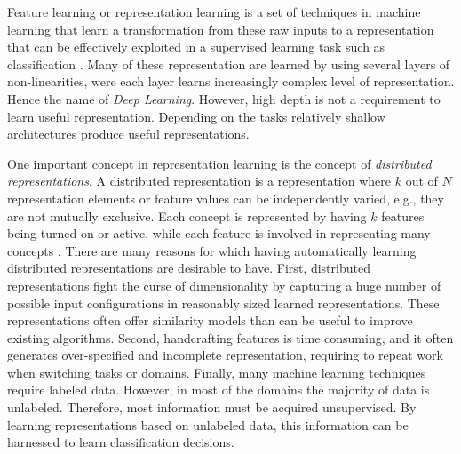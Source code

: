 Feature learning or representation learning is a set of techniques in machine
learning that learn a transformation from these raw inputs to a representation that
can be effectively exploited in a supervised learning task such as
classification \cite{DBLP:journals/corr/abs-1206-5538}. 
Many of these representation  are learned by using several layers of
non-linearities, were each layer learns increasingly complex level of
representation. Hence the name of \textit{Deep Learning}. However, high depth is
not a requirement to learn useful representation. Depending on the tasks
relatively shallow architectures produce useful representations.

One important  concept in representation learning  is the concept of
\textit{distributed representations}.  A distributed representation is a representation  where $k$ 
out of $N$ representation elements or feature values can be independently
varied, e.g., they are not mutually exclusive. Each concept is represented by
having $k$ features being turned on or active, while each feature is involved
in representing many concepts \cite{DBLP:journals/corr/abs-1206-5538}.
There are many reasons for which having automatically learning distributed representations are
desirable to have.  First,  distributed representations fight the curse of
dimensionality by capturing a huge number of possible input configurations in
reasonably sized learned representations. These representations often offer
similarity models than can be useful to improve existing algorithms.
Second,  handcrafting features is time consuming, and it often generates
over-specified and incomplete representation, requiring to repeat work when
switching tasks or  domains. Finally, many machine learning techniques
require labeled data.  However, in most of the domains the majority of data is unlabeled.
Therefore, most information must be acquired unsupervised. By learning
representations based on unlabeled data, this information can be harnessed
to learn classification decisions.








